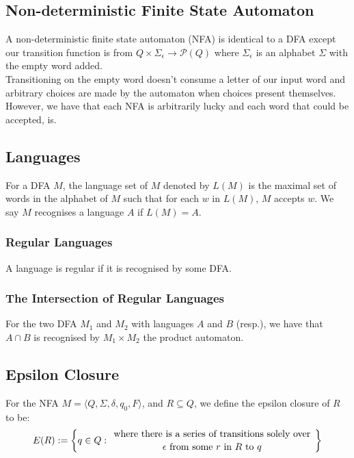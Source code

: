 \subsection{Non-deterministic Finite State Automaton}

A non-deterministic finite state automaton (NFA) is identical
to a DFA except our transition function is from 
$Q \times \Sigma_\epsilon \to \mathcal{P}(Q)$ where
$\Sigma_\epsilon$ is an alphabet $\Sigma$ with the empty word
added.
\\[\baselineskip]
Transitioning on the empty word doesn't consume a letter of our
input word and arbitrary choices are made by the automaton when
choices present themselves. However, we have that each NFA is
arbitrarily lucky and each word that could be accepted, is.
    
\subsection{Languages}

For a DFA $M$, the language set of $M$ denoted by $L(M)$
is the maximal set of words in the alphabet of $M$ such that
for each $w$ in $L(M)$, $M$ accepts $w$. We say $M$ recognises
a language $A$ if $L(M) = A$.

\subsubsection{Regular Languages}

A language is regular if it is recognised by some DFA.

\subsubsection{The Intersection of Regular Languages}

For the two DFA $M_1$ and $M_2$ with languages
$A$ and $B$ (resp.), we have that $A \cap B$ is
recognised by $M_1 \times M_2$ the product automaton.

\subsection{Epsilon Closure}

For the NFA $M =  \langle Q, \Sigma, \delta, q_0, F \rangle$, 
and $R \subseteq Q$, we define the epsilon closure
of $R$ to be: \begin{gather*}
    E(R) := \left\{
        q \in Q : \bfrac{
        \text{ where there is a series of 
        transitions solely over }
    }{
        \epsilon \text{ from some } r \text{ in } 
        R \text{ to } q
    }\right\}
\end{gather*}

